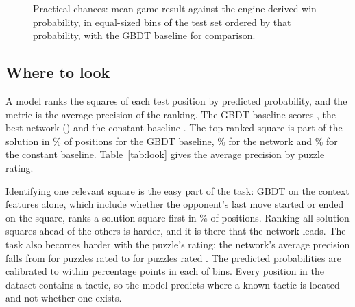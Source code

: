 \documentclass[11pt]{article}
\begin{document}
\begin{figure}[htbp]\centering
{}
\caption{Practical chances: mean game result against the engine-derived win
probability, in equal-sized bins of the test set ordered by that
probability, with the GBDT baseline for comparison.}
\label{fig:practical}
\end{figure}

\subsection{Where to look}

A model ranks the squares of each test position by predicted probability,
and the metric is the average precision of the ranking. The GBDT baseline
scores , the best network
()  and the
constant baseline . The top-ranked square is
part of the solution in \% of
positions for the GBDT baseline, \%
for the network and \% for the constant
baseline. Table~\ref{tab:look} gives the average precision by puzzle rating.

\begin{table}[htbp]\centering\small
{}
\caption{Where to look: average precision of each model by the puzzle's
rating.}
\label{tab:look}
\end{table}

Identifying one relevant square is the easy part of the task: GBDT on the
context features alone, which include whether the opponent's last move
started or ended on the square, ranks a solution square first in
\% of positions. Ranking all
solution squares ahead of the others is harder, and it is there that the
network leads. The task also becomes harder with the puzzle's rating: the
network's average precision falls from  for
puzzles rated  to
 for puzzles rated
. The predicted probabilities are calibrated to
within  percentage points in
each of  bins. Every position in
the dataset contains a tactic, so the model predicts where a known tactic is
located and not whether one exists.
\end{document}
